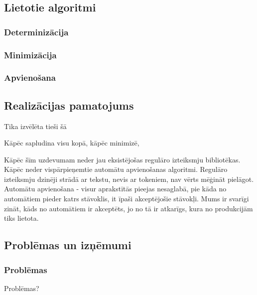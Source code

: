 \subsection{Lietotie algoritmi}
\label{subsec:solution_algorithms}

\subsubsection{Determinizācija}

\subsubsection{Minimizācija}

\subsubsection{Apvienošana}

\subsection{Realizācijas pamatojums}
\label{subsec:solution_motivation}

Tika izvēlēta tieši šā

Kāpēc sapludina visu kopā, kāpēc minimizē, 


Kāpēc šīm uzdevumam neder jau eksistējošas regulāro izteiksmju bibliotēkas. Kāpēc  neder vispārpieņemtie automātu apvienošanas algoritmi.
Regulāro izteiksmju dzinēji strādā ar tekstu, nevis ar tokeniem, nav vērts mēģināt pielāgot. Automātu apvienošana - visur aprakstītās pieejas nesaglabā, pie kāda no automātiem pieder katrs stāvoklis, it īpaši akceptējošie stāvokļi. Mums ir svarīgi zināt, kāds no automātiem ir akceptēts, jo no tā ir atkarīgs, kura no produkcijām tiks lietota. 

\subsection{Problēmas un izņēmumi}
\label{subsec:solution_problems}
\subsubsection{Problēmas}
Problēmas?

